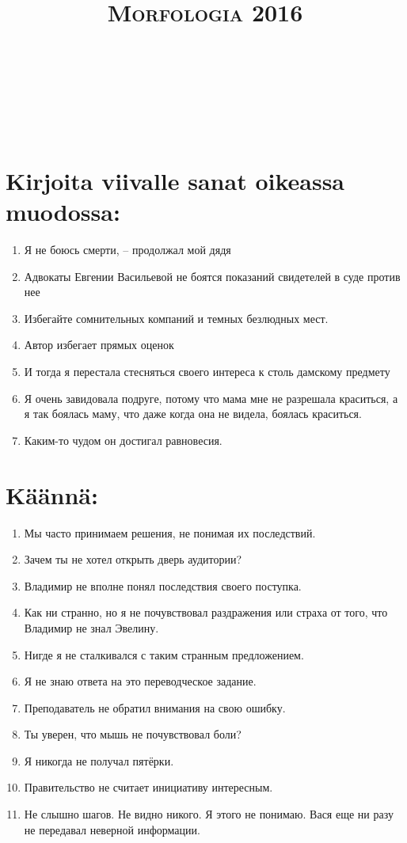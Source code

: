 \documentclass[paper=a4, fontsize=11pt]{scrartcl}
\title{	
\normalfont \normalsize 
\textsc{Morfologia 2016} \\ [25pt] 
\horrule{0.5pt} \\[0.4cm] 
\huge  \\ 
\horrule{2pt} \\[0.5cm] 
}
\date{}
\begin{document}
\onehalfspacing

\section{Kirjoita viivalle sanat oikeassa muodossa:}

\begin{enumerate}
    \item Я не боюсь смерти, -- продолжал мой дядя
    \item Адвокаты Евгении Васильевой не боятся показаний свидетелей в суде против нее
    \item Избегайте сомнительных компаний и темных безлюдных мест.
    \item Автор избегает прямых оценок
    \item И тогда я перестала стесняться своего интереса к столь дамскому предмету
    \item Я очень завидовала подруге, потому что мама мне не разрешала краситься, а я так боялась маму, что даже когда она не видела, боялась краситься.
    \item Каким-то чудом он достигал равновесия.
\end{enumerate}

\section{Käännä:}

\begin{enumerate}
    \item Мы часто принимаем решения, не понимая их последствий.
    \item Зачем ты не хотел открыть дверь аудитории? 
    \item Владимир не вполне понял последствия своего поступка. 
    \item Как ни странно, но я не почувствовал раздражения или страха от того, что Владимир не знал Эвелину.
    \item Нигде я не сталкивался с таким странным предложением. 
    \item Я не знаю ответа на это переводческое задание.
    \item Преподаватель не обратил внимания на свою ошибку.
    \item Ты уверен, что мышь не почувствовал боли? 
    \item Я никогда не получал пятёрки.
    \item Правительство не считает инициативу интересным.
    \item Не слышно шагов. Не видно никого. Я этого не понимаю. Вася еще ни разу не передавал неверной информации.
\end{enumerate}
\end{document}
